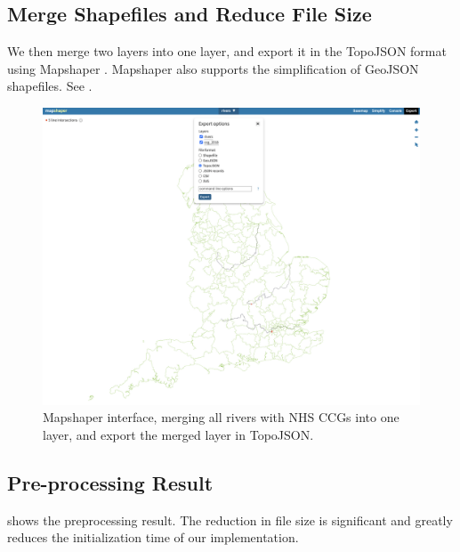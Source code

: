 \documentclass[Afour,sagev,times]{sagej}
\begin{document}
{}

\subsection{Merge Shapefiles and Reduce File Size}

We then merge two layers into one layer, and export it in the TopoJSON format using Mapshaper \cite{blochMapshaper}.
Mapshaper also supports the simplification of GeoJSON shapefiles.
See .

{
\begin{figure}[H]
    \centering
    \includegraphics[width=\columnwidth]{export_topojson.png}
    \caption{Mapshaper interface, merging all rivers with NHS CCGs into one layer, and export the merged layer in TopoJSON.}
    \label{fig:export_topojson}
\end{figure}
}

\subsection{Pre-processing Result}

 shows the preprocessing result.
The reduction in file size is significant and greatly reduces the initialization time of our implementation.
\end{document}
